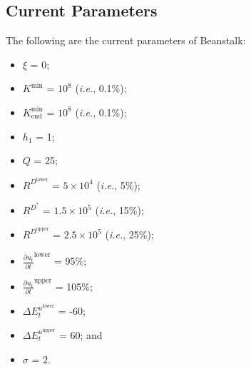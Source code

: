 \documentclass[class=article, crop=false]{standalone}
\begin{document}
\subsection{Current Parameters}
The following are the current parameters of Beanstalk:
\begin{itemize}[itemsep=3pt,leftmargin=16pt]
    \item \hyperlink{ht1}{$\xi$} = 0;
    \item \hyperlink{ht119}{$K^{\text{min}}$} = $10^8$ (\textit{i.e.}, 0.1\%);
    \item $K_{\text{end}}^{\text{min}}$ = $10^8$ (\textit{i.e.}, 0.1\%);
    \item $h_1$ = 1;
    \item $Q$ = 25;
    \item $R^{D^{\text{lower}}}$ = $5 \times 10^4$ (\textit{i.e.}, 5\%);
    \item $R^{D^*}$ = $1.5 \times 10^5$ (\textit{i.e.}, 15\%);
    \item $R^{D^{\text{upper}}}$ = $2.5 \times 10^5$ (\textit{i.e.}, 25\%);
    \item $\frac{\partial u_t}{\partial t}^{\text{lower}}$ = 95\%;
    \item $\frac{\partial u_t}{\partial t}^{\text{upper}}$ = 105\%;
    \item $\Delta E_{t}^{u^{\text{lower}}}$ = -60;
    \item $\Delta E_{t}^{u^{\text{upper}}}$ = 60; and
    \item $\sigma$ = 2.
\end{itemize}
\end{document}
